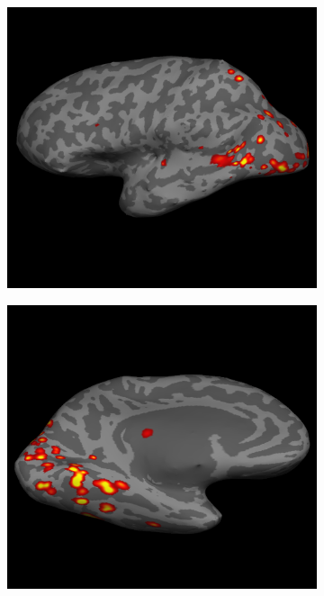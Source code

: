 \documentclass[5p,authoryear]{elsarticle}
\begin{document}
\begin{figure}[p]
\begin{subfigure}{0.3\textwidth}
\caption{}
\label{fig:s2-rh-lateral-sensitivity}
\end{subfigure}
\begin{subfigure}{0.3\textwidth}
\centering
\includegraphics[width=\textwidth]{figures/s3-lh-lateral-sensitivity}
\caption{}
\label{fig:s3-lh-lateral-sensitivity}
\end{subfigure}
\begin{subfigure}{0.3\textwidth}
\centering
\includegraphics[width=\textwidth]{figures/s1-lh-medial-sensitivity}

\end{subfigure}
\end{figure}
\end{document}
